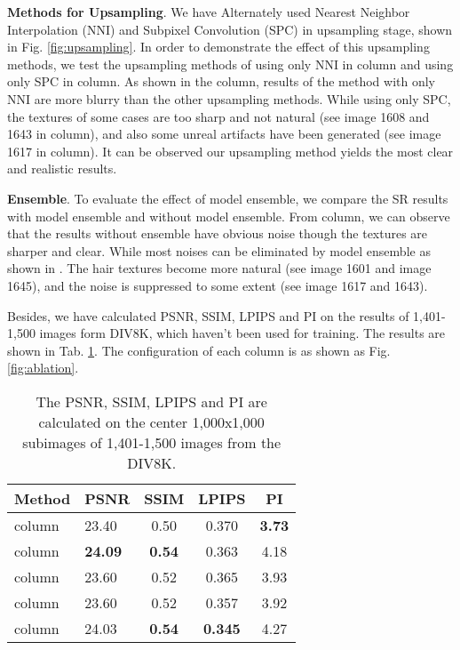 \documentclass[10pt,twocolumn,letterpaper]{article}
\begin{document}
\textbf{Methods for Upsampling}. We have Alternately used Nearest Neighbor Interpolation (NNI) and Subpixel Convolution (SPC) in upsampling stage, shown in Fig. \ref{fig:upsampling}. In order to demonstrate the effect of this upsampling methods, we test the upsampling methods of using only NNI in  column and using only SPC in  column. As shown in the  column, results of the method with only NNI are more blurry than the other upsampling methods. While using only SPC, the textures of some cases are too sharp and not natural (see image 1608 and 1643 in  column), and also some unreal artifacts have been generated (see image 1617 in  column). It can be observed our upsampling method yields the most clear and realistic results. 

\textbf{Ensemble}. To evaluate the effect of model ensemble, we compare the SR results with model ensemble and without model ensemble. From  column, we can observe that the results without ensemble have obvious noise though the textures are sharper and clear. While  most noises can be eliminated by model ensemble as shown in . The hair textures become more natural (see image 1601 and image 1645), and the noise is suppressed to some extent (see image 1617 and 1643).

Besides, we have calculated PSNR, SSIM, LPIPS and PI on the results of 1,401-1,500 images form DIV8K, which haven't been used for training. The results are shown in Tab. \ref{tab:validation2}. The configuration of each  column is as shown as Fig. \ref{fig:ablation}.

\begin{table}[htbp]
\centering
\begin{tabular}{llccc}
\hline \hline
\multicolumn{1}{l|}{Method}          & PSNR    & SSIM     & LPIPS   & PI    \\ \hline

\multicolumn{1}{l|}{ column} & 23.40  & 0.50  & 0.370  & \textbf{3.73} \\
\multicolumn{1}{l|}{ column} & \textbf{24.09}  & \textbf{0.54}  & 0.363  & 4.18 \\
\multicolumn{1}{l|}{ column} & 23.60  & 0.52  & 0.365  & 3.93 \\
\multicolumn{1}{l|}{ column} & 23.60  & 0.52  & 0.357  & 3.92      \\
\multicolumn{1}{l|}{ column} & 24.03  & \textbf{0.54}  & \textbf{0.345}  & 4.27      \\
\hline\hline
\end{tabular}
\caption{The PSNR, SSIM, LPIPS and PI are calculated on the center 1,000x1,000 subimages of 1,401-1,500 images from the DIV8K.}
\label{tab:validation2}
\end{table}
\end{document}
